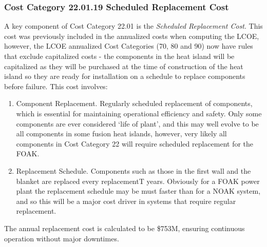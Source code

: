 \subsubsection*{Cost Category 22.01.19 Scheduled Replacement Cost}

A key component of Cost Category 22.01 is the \textit{Scheduled Replacement Cost}.  This cost was previously included in the annualized costs when computing the LCOE, however, the LCOE annualized Cost Categories (70, 80 and 90) now have rules that exclude capitalized costs - the components in the heat island will be capitalized as they will be purchased at the time of construction of the heat island so they are ready for installation on a schedule to replace components before failure.  This cost involves:

\begin{enumerate}
    \item Component Replacement. Regularly scheduled replacement of components, which is essential for maintaining operational efficiency and safety.  Only some components are ever considered `life of plant', and this may well evolve to be all components in some fusion heat islands, however, very likely all components in Cost Category 22 will require scheduled replacement for the FOAK.
    \item Replacement Schedule. Components such as those in the first wall and the blanket are replaced every replacementT years.  Obviously for a FOAK power plant the replacement schedule may be must faster than for a NOAK system, and so this will be a major cost driver in systems that require regular replacement.
\end{enumerate}

The annual replacement cost is calculated to be \$753M, ensuring continuous operation without major downtimes.